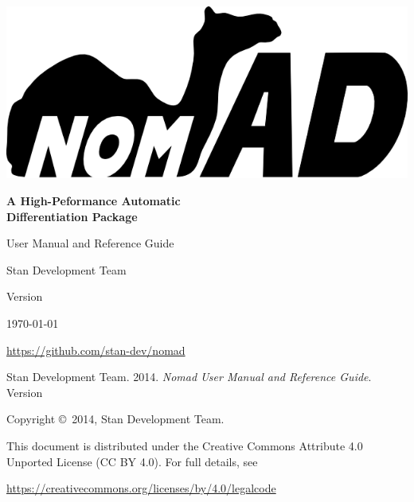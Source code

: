 
\includegraphics[width=6in]{../logo/logo.png}

\thispagestyle{empty}
\begin{center}

{ \Huge \textbf{ A High-Peformance Automatic \\ Differentiation Package} }

\vspace{10mm}

{ \LARGE User Manual and Reference Guide }

\vspace{20mm}

{ \Large Stan Development Team }

\vfill

{ \Large

Version \nomadversion

\today

\url{https://github.com/stan-dev/nomad}

}

\end{center}

\newpage
\thispagestyle{empty}

\mbox{}
\vfill


\noindent Stan Development Team. 2014.  
{\it  Nomad User Manual and Reference Guide}. Version \nomadversion

\vspace{5mm}

\noindent Copyright \copyright \ 2014, Stan Development Team.

\vspace{5mm}

\noindent This document is distributed under the Creative Commons Attribute 4.0
Unported License (CC BY 4.0).  For full details, see

\begin{center}
\url{https://creativecommons.org/licenses/by/4.0/legalcode} 
\end{center}
